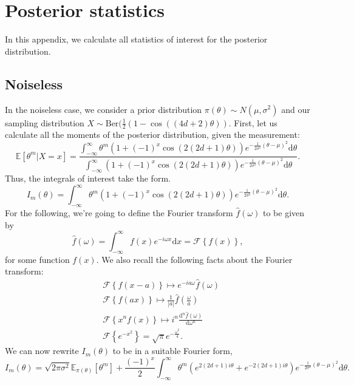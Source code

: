 \section{Posterior statistics}
In this appendix, we calculate all statistics of interest for the posterior distribution.
\subsection{Noiseless}
\label{app::noiseless}
In the noiseless case, we consider a prior distribution $\pi(\theta) \sim N(\mu, \sigma^2)$ and our sampling distribution $X \sim \text{Ber}(\frac{1}{2} (1 - \cos((4d+2) \theta))$. First, let us calculate all the moments of the posterior distribution, given the measurement:
\[
	\mathbb{E}\left[ \theta^{m} | X = x \right] = \frac{\int_{- \infty}^{\infty} \theta^{m} \left( 1 + \left( -1 \right) ^{x} \cos\left( 2\left( 2d + 1 \right) \theta \right)  \right) e^{-\frac{1}{2 \sigma^2} \left( \theta - \mu \right) ^2} \text{d}\theta}{\int_{- \infty}^{\infty} \left( 1 + \left( -1 \right) ^{x} \cos\left( 2\left( 2d + 1 \right) \theta \right)  \right) e^{-\frac{1}{2 \sigma^2} \left( \theta - \mu \right) ^2} \text{d}\theta}
.\]
Thus, the integrals of interest take the form.
\[
I_m(\theta) = \int_{- \infty}^{\infty} \theta^{m} \left( 1 + \left( -1 \right) ^{x} \cos\left( 2 \left( 2 d + 1 \right) \theta \right)  \right) e^{- \frac{1}{2 \sigma^2} \left( \theta - \mu \right) ^2}\text{d}\theta
.\]
For the following, we're going to define the Fourier transform $\hat{f}\left( \omega \right) $ to be given by
\[
	\hat{f}\left( \omega \right) = \int_{- \infty}^{\infty} f(x) e^{ - i \omega x}\text{d}x = \mathcal{F}\left\{ f(x) \right\} ,
\]
for some function $f(x)$. We also recall the following facts about the Fourier transform:
\begin{align}
&	\mathcal{F}\left\{ f(x-a) \right\} \mapsto e^{- i a \omega}\hat{f}(\omega)\label{eqn::fourier-trans}	\\
&	\mathcal{F}\left\{ f(ax) \right\}   \mapsto \frac{1}{|a|}\hat{f}(\frac{\omega}{a}) \label{eqn::fourier-mult} \\
&	\mathcal{F}\left\{ x^{n}f(x) \right\}  \mapsto i^{n} \frac{\text{d}^{n} \hat{f}(\omega)}{\text{d}\omega^{n}} \label{eqn::fourier-power} \\
&	\mathcal{F} \left\{ e^{- x^2} \right\}  = \sqrt{\pi} e^{- \frac{\omega^2}{4}}. \label{eqn::fourier-gauss}
\end{align}
We can now rewrite $I_m(\theta)$ to be in a suitable Fourier form,
\[
	I_m(\theta) = \sqrt{2 \pi \sigma^2} \mathbb{E}_{\pi(\theta)}\left[ \theta^{m} \right]  + \frac{ \left( -1 \right)^{x} }{2}\int_{- \infty}^{\infty} \theta^{m} \left( e^{2(2d + 1)i \theta} + e^{ - 2(2d+1)i\theta}\right) e^{- \frac{1}{2 \sigma^2} \left( \theta - \mu \right) ^2}\text{d}\theta
.\]
